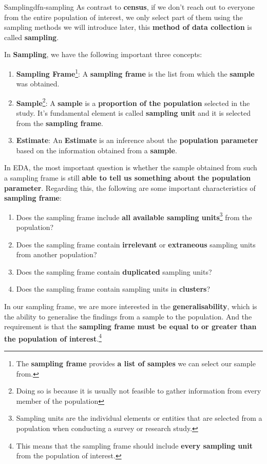 \documentclass[math,code]{amznotes}
\theoremstyle{remark}
\begin{document}
\begin{dfnbox}{Sampling}{dfn-sampling}
    As contrast to \textbf{census}, if we don't reach out to everyone from the entire population of interest, we only select part of them using the sampling methods we will introduce later, this \textbf{method of data collection} is called {\color{red} \textbf{sampling}}.
\end{dfnbox}
In \textbf{Sampling}, we have the following important three concepts:
\begin{enumerate}
    \item \textbf{Sampling Frame}\footnote{The \textbf{sampling frame} provides \textbf{a list of samples} we can select our sample from.}: A \textbf{sampling frame} is the list from which the \textbf{sample} was obtained.
    \item \textbf{Sample}\footnote{Doing so is because it is usually not feasible to gather information from every member of the population}: A \textbf{sample} is a \textbf{proportion of the population} selected in the study. It's fundamental element is called \textbf{sampling unit} and it is selected from the \textbf{sampling frame}.
    \item \textbf{Estimate}: An \textbf{Estimate} is an inference about the \textbf{population parameter} based on the information obtained from a \textbf{sample}.
\end{enumerate}

In EDA, the most important question is whether the sample obtained from such a sampling frame is still \textbf{able to tell us something about the population parameter}. Regarding this, the following are some important characteristics of \textbf{sampling frame}:
\begin{enumerate}
    \item Does the sampling frame include \textbf{all available sampling units}\footnote{Sampling units are the individual elements or entities that are selected from a population when conducting a survey or research study.} from the population?
    \item Does the sampling frame contain \textbf{irrelevant} or \textbf{extraneous} sampling units from another population?
    \item Does the sampling frame contain \textbf{duplicated} sampling units?
    \item Does the sampling frame contain sampling units in \textbf{clusters}?
\end{enumerate}
In our sampling frame, we are more interested in the \textbf{generalisability}, which is the ability to generalise the findings from a sample to the population. And the requirement is that the \textbf{sampling frame must be equal to or greater than the population of interest}.\footnote{This means that the sampling frame should include \textbf{every sampling unit} from the population of interest.}
\end{document}
